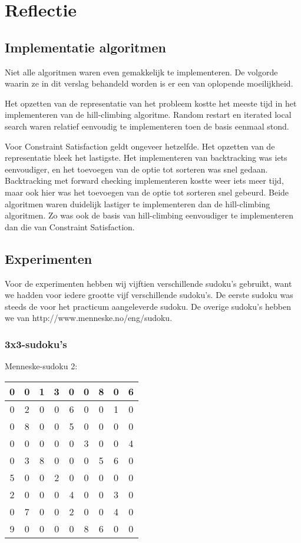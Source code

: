 \documentclass[]{report}
\begin{document}
\chapter{Reflectie}
\section{Implementatie algoritmen}
Niet alle algoritmen waren even gemakkelijk te implementeren. De volgorde waarin ze in dit verslag behandeld worden is er een van oplopende moeilijkheid. 

Het opzetten van de representatie van het probleem kostte het meeste tijd in het implementeren van de hill-climbing algoritme. Random restart en iterated local search waren relatief eenvoudig te implementeren toen de basis eenmaal stond.

Voor Constraint Satisfaction geldt ongeveer hetzelfde. Het opzetten van de representatie bleek het lastigste. Het implementeren van backtracking was iets eenvoudiger, en het toevoegen van de optie tot sorteren was snel gedaan. Backtracking met forward checking implementeren kostte weer iets meer tijd, maar ook hier was het toevoegen van de optie tot sorteren snel gebeurd. Beide algoritmen waren duidelijk lastiger te implementeren dan de hill-climbing algoritmen. Zo was ook de basis van hill-climbing eenvoudiger te implementeren dan die van Constraint Satisfaction.

\section{Experimenten}
Voor de experimenten hebben wij vijftien verschillende sudoku's gebruikt, want we hadden voor iedere grootte vijf verschillende sudoku's. De eerste sudoku was steeds de voor het practicum aangeleverde sudoku. De overige sudoku's hebben we van http://www.menneske.no/eng/sudoku. 

\subsection{3x3-sudoku's}
Menneske-sudoku 2:
\begin{tabular}{|c|c|c||c|c|c||c|c|c|}
\hline
0 &0& 1& 3& 0& 0& 8& 0& 6 \\ \hline
0 &2 &0 &0 &6 &0 &0& 1& 0\\ \hline
0& 8& 0& 0& 5& 0& 0& 0& 0\\ \hline\hline
0& 0& 0& 0& 0& 3& 0& 0& 4\\ \hline
0 &3 &8 &0 &0 &0 &5 &6 &0\\ \hline
5& 0& 0& 2& 0& 0& 0& 0& 0\\ \hline\hline
2& 0& 0& 0& 4& 0& 0& 3& 0\\ \hline
0 &7 &0 &0 &2 &0 &0 &4 &0\\ \hline
9 &0 &0 &0 &0 &8 &6 &0& 0\\ \hline
\end{tabular}
\end{document}
